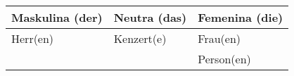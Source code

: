 \documentclass{article}
\renewcommand{\arraystretch}{1}
\begin{document}
\begin{table}[h!]
    \centering
    \label{tab:tabla1}
    \renewcommand{\arraystretch}{1.5}
    \begin{tabular}{|>{\raggedright\arraybackslash}p{5cm}|>{\raggedright\arraybackslash}p{5cm}|>{\raggedright\arraybackslash}p{5cm}|}
        \hline
        \rowcolor{gray!20} \textbf{Maskulina (der)} & \textbf{Neutra (das)} & \textbf{Femenina (die)} \\
        \hline
        Herr(en) & Kenzert(e) & Frau(en) \\\hline
         &  & Person(en) \\\hline
    \end{tabular}
\end{table}
\end{document}
